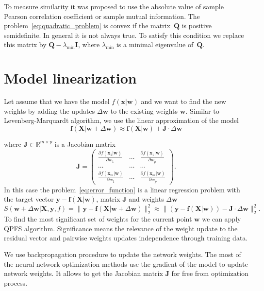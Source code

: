 \documentclass[a4paper,12pt]{article}
\theoremstyle{plain} %
\theoremstyle{definition} %
\theoremstyle{remark} %
\newcommand{\bw}{\mathbf{w}}
\newcommand{\by}{\mathbf{y}}
\newcommand{\bx}{\mathbf{x}}
\newcommand{\bJ}{\mathbf{J}}
\newcommand{\bQ}{\mathbf{Q}}
\newcommand{\bbR}{\mathbb{R}}
\newcommand{\bX}{\mathbf{X}}
\begin{document}
  	To measure similarity it was proposed to use the absolute value of sample Pearson correlation coefficient or sample mutual information.
  	The problem~\ref{eq:quadratic_problem} is convex if the matrix~$\bQ$ is positive semidefinite. In general it is not always true. To satisfy this condition we replace this matrix by $\bQ - \lambda_{\text{min}} \mathbf{I}$, where $\lambda_{\text{min}} $ is a minimal eigenvalue of~$\bQ$.
  	
  	\section*{Model linearization}
  	Let assume that we have the model $f(\bx | \bw)$ and we want to find the new weights by adding the updates $\Delta \bw$ to the existing weights $\bw$. Similar to Levenberg-Marquardt algorithm, we use the linear approximation of the model
  	\[
	  	\mathbf{f}(\bX | \bw + \Delta \bw) \approx \mathbf{f}(\bX | \bw) + \bJ \cdot \Delta  \bw
	\]
	
	where $\mathbf{J} \in \bbR^{m \times p}$ is a Jacobian matrix
	\begin{equation}
		\bJ = 
		\begin{pmatrix}
		\frac{\partial f(\bx_1 | \bw)}{\partial w_1} & \dots & 
		\frac{\partial f(\bx_1 | \bw)}{\partial w_p} \\
		\dots & \dots & \dots \\
		\frac{\partial f(\bx_m | \bw)}{\partial w_1} & \dots & 
		\frac{\partial f(\bx_m | \bw)}{\partial w_p}
		\end{pmatrix}.
	\end{equation}
	In this case the problem~\ref{eq:error_function} is a linear regression problem with the target vector $\by - \mathbf{f}(\bX | \bw)$, matrix $\bJ$ and weights $\Delta \bw$
	\[
		S(\bw + \Delta \bw | \bX, \by, f) =  \| \by - \mathbf{f}(\bX | \bw + \Delta \bw)\|_2^2 \approx  \| (\by - \mathbf{f}(\bX | \bw)) - \bJ \cdot \Delta  \bw\|_2^2.
	\]
  	To find the most significant set of weights for the current point $\bw$ we can apply QPFS algorithm. Significance means the relevance of the weight update to the residual vector and pairwise weights updates independence through training data.
  	
  	We use backpropagation procedure to update the network weights. The most of the neural network optimization methods use the gradient of the model to update network weights. It allows to get the Jacobian matrix $\bJ$ for free from optimization process. 
  	
\end{document}
